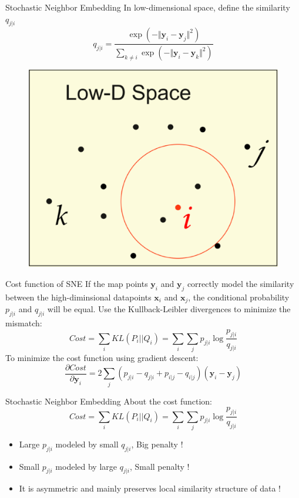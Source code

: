 \documentclass[10pt]{beamer}
\newcommand{\bol}[1]{\textbf{#1}}
\begin{document}
\begin{frame}{Stochastic Neighbor Embedding}
In low-dimensional space, define the similarity $q_{j|i}$
\begin{displaymath}
	q_{j|i} = \frac{\exp{(-\Vert\bol{y}_i - \bol{y}_j\Vert^2)}}{\sum_{k \neq i}\exp(-\Vert\bol{y}_i - \bol{y}_k\Vert^2)}
\end{displaymath}
\begin{figure}
\centering
\includegraphics[scale=0.2]{./image/ld.eps}
\end{figure}
\end{frame}


\begin{frame}{Cost function of SNE}
If the map points $\bol{y}_i$ and $\bol{y}_j$ correctly model the similarity between the high-diminsional datapoints $\bol{x}_i$ and $\bol{x}_j$, the conditional probability $p_{j|i}$ and $q_{j|i}$ will be equal. Use the Kullback-Leibler divergences to minimize the mismatch:
\begin{displaymath}
	Cost = \sum_i KL(P_i||Q_i) = \sum_i\sum_j p_{j|i} \log\frac{p_{j|i}}{q_{j|i}}
\end{displaymath}
To minimize the cost function using gradient descent:
\begin{displaymath}
	\frac{\partial Cost}{\partial \bol{y}_i} = 2\sum_j (p_{j|i} - q_{j|i} + p_{i|j} - q_{i|j})(\bol{y}_i - \bol{y}_j)
\end{displaymath}
\end{frame}


\begin{frame}{Stochastic Neighbor Embedding}
About the cost function:
\begin{displaymath}
	Cost = \sum_i KL(P_i||Q_i) = \sum_i\sum_j p_{j|i} \log\frac{p_{j|i}}{q_{j|i}}
\end{displaymath}
\begin{itemize}
	\item Large $p_{j|i}$ modeled by small $q_{j|i}$, Big penalty !
	\item Small $p_{j|i}$ modeled by large $q_{j|i}$, Small penalty ! 
	\item It is asymmetric and mainly preserves local similarity structure of data !
\end{itemize}
\end{frame}
\end{document}
